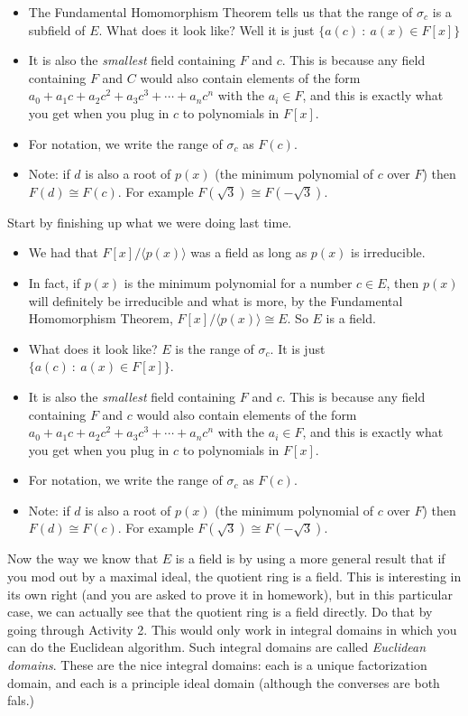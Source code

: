 \documentclass[12pt]{article}
\theoremstyle{plain}
\theoremstyle{definition}
\theoremstyle{remark}
\def\st{~:~}
\newcommand{\todayis}[1]{\clearpage{\rhead{\footnotesize #1}}}
\begin{document}
\begin{itemize}
\item The Fundamental Homomorphism Theorem tells us that the range of $\sigma_c$ is a subfield of $E$.  What does it look like?  Well it is just $\{a(c) \st a(x) \in F[x]\}$
\item It is also the {\em smallest} field containing $F$ and $c$.  This is because any field containing $F$ and $C$ would also contain elements of the form $a_0 + a_1c + a_2c^2 + a_3c^3 + \cdots + a_n c^n$ with the $a_i \in F$, and this is exactly what you get when you plug in $c$ to polynomials in $F[x]$.
\item For notation, we write the range of $\sigma_c$ as $F(c)$.
\item Note: if $d$ is also a root of $p(x)$ (the minimum polynomial of $c$ over $F$) then $F(d) \cong F(c)$.  For example $F(\sqrt{3}) \cong F(-\sqrt{3})$.
\end{itemize}



\todayis{Friday, January 11}

Start by finishing up what we were doing last time.  

\begin{itemize}
  \item  We had that $F[x]/\langle p(x) \rangle$ was a field as long as $p(x)$ is irreducible.  
  \item In fact, if $p(x)$ is the minimum polynomial for a number $c \in E$, then $p(x)$ will definitely be irreducible and what is more, by the Fundamental Homomorphism Theorem, $F[x]/\langle p(x) \rangle \cong E$.  So $E$ is a field. 
  \item What does it look like? $E$ is the range of $\sigma_c$.  It is just $\{a(c) \st a(x) \in F[x]\}$.
  \item It is also the {\em smallest} field containing $F$ and $c$.  This is because any field containing $F$ and $c$ would also contain elements of the form $a_0 + a_1c + a_2c^2 + a_3c^3 + \cdots + a_n c^n$ with the $a_i \in F$, and this is exactly what you get when you plug in $c$ to polynomials in $F[x]$.
  \item For notation, we write the range of $\sigma_c$ as $F(c)$.
  \item Note: if $d$ is also a root of $p(x)$ (the minimum polynomial of $c$ over $F$) then $F(d) \cong F(c)$.  For example $F(\sqrt{3}) \cong F(-\sqrt{3})$.
\end{itemize}

Now the way we know that $E$ is a field is by using a more general result that if you mod out by a maximal ideal, the quotient ring is a field.  This is interesting in its own right (and you are asked to prove it in homework), but in this particular case, we can actually see that the quotient ring is a field directly.  Do that by going through Activity 2.  This would only work in integral domains in which you can do the Euclidean algorithm.  Such integral domains are called \emph{Euclidean domains}.  These are the nice integral domains: each is a unique factorization domain, and each is a principle ideal domain (although the converses are both fals.)
\end{document}
